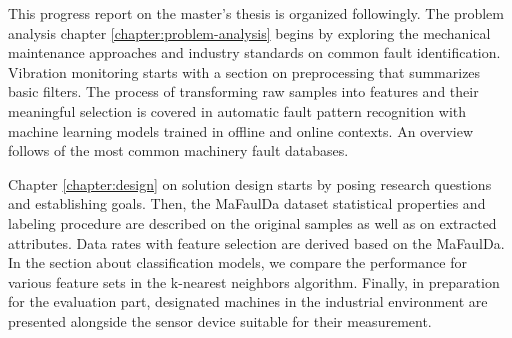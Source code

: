 This progress report on the master's thesis  is organized followingly. The problem analysis chapter \ref{chapter:problem-analysis} begins by exploring the mechanical maintenance approaches and industry standards on common fault identification. Vibration monitoring starts with a section on preprocessing that summarizes basic filters. The process of transforming raw samples into features and their meaningful selection is covered in automatic fault pattern recognition with machine learning models trained in offline and online contexts. An overview follows of the most common machinery fault databases. 

Chapter \ref{chapter:design} on solution design starts by posing research questions and establishing goals. Then, the MaFaulDa dataset statistical properties and labeling procedure are described on the original samples as well as on extracted attributes. Data rates with feature selection are derived based on the MaFaulDa. In the section about classification models, we compare the performance for various feature sets in the k-nearest neighbors algorithm. Finally, in preparation for the evaluation part, designated machines in the industrial environment are presented alongside the sensor device suitable for their measurement.
